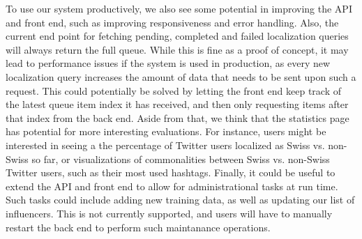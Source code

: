 \documentclass[10pt,a4paper]{article}
\begin{document}
To use our system productively, we also see some potential in improving the API and front end, such as improving responsiveness and error handling. Also, the current end point for fetching pending, completed and failed localization queries will always return the full queue. While this is fine as a proof of concept, it may lead to performance issues if the system is used in production, as every new localization query increases the amount of data that needs to be sent upon such a request. This could potentially be solved by letting the front end keep track of the latest queue item index it has received, and then only requesting items after that index from the back end. Aside from that, we think that the statistics page has potential for more interesting evaluations. For instance, users might be interested in seeing a the percentage of Twitter users localized as Swiss vs. non-Swiss so far, or visualizations of commonalities between Swiss vs. non-Swiss Twitter users, such as their most used hashtags. Finally, it could be useful to extend the API and front end to allow for administrational tasks at run time. Such tasks could include adding new training data, as well as updating our list of influencers. This is not currently supported, and users will have to manually restart the back end to perform such maintanance operations.

\clearpage


\end{document}
